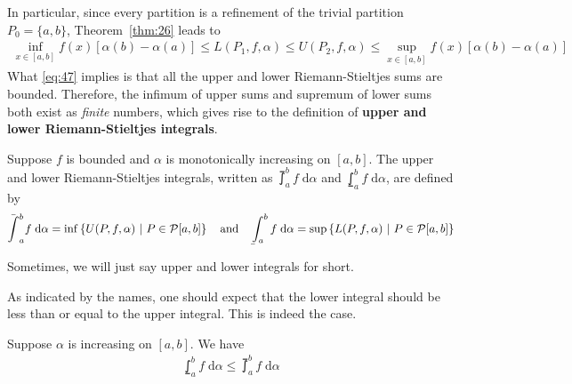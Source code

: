 \documentclass[thmcnt=section, 12pt]{my-elegantbook}
\begin{document}

In particular, since every partition is a refinement of the trivial partition $P_0 = \{a, b\}$, Theorem~\ref{thm:26} leads to
\begin{align}
    \inf_{x\in[a,b]} f(x) [\alpha(b) - \alpha(a)]
    \leq L(P_1, f, \alpha) \leq U(P_2, f, \alpha)
    \leq \sup_{x\in[a,b]} f(x) [\alpha(b) - \alpha(a)]
    \label{eq:47}
\end{align}
What \eqref{eq:47} implies is that all the upper and lower Riemann-Stieltjes sums are bounded. Therefore, the infimum of upper sums and supremum of lower sums both exist as \textit{finite} numbers, which gives rise to the definition of \textbf{upper and lower Riemann-Stieltjes integrals}.

\begin{definition}
    Suppose $f$ is bounded and $\alpha$ is monotonically increasing on $[a, b]$. The upper and lower Riemann-Stieltjes integrals, written as $\upint_a^b f \; \mathrm{d}\alpha$ and $\lowint_a^b f \; \mathrm{d}\alpha$, are defined by
    \begin{align*}
        \upint_a^b f \; \mathrm{d}\alpha
        = \inf \set{U(P,f,\alpha)}{P \in \mathcal{P}[a,b]}
        \quad \text{and} \quad
        \lowint_a^b f \; \mathrm{d}\alpha
        = \sup \set{L(P,f,\alpha)}{P \in \mathcal{P}[a,b]}
    \end{align*}
\end{definition}


Sometimes, we will just say upper and lower integrals for short.

As indicated by the names, one should expect that the lower integral should be less than or equal to the upper integral. This is indeed the case.

\begin{theorem}
    Suppose $\alpha$ is increasing on $[a, b]$. We have
    \begin{align}
        \lowint_a^b f \; \mathrm{d}\alpha
        \leq \upint_a^b f \; \mathrm{d}\alpha
        \label{eq:48}
    \end{align}
\end{theorem}
\end{document}
